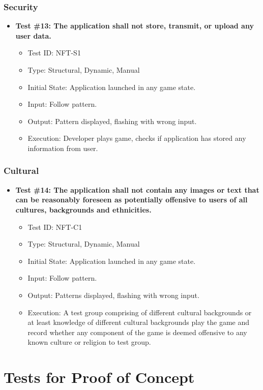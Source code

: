 \documentclass[12pt, titlepage]{article}
\begin{document}
\subsubsection{Security}
\begin{itemize}
\item \textbf{Test \#13: The application shall not store, transmit, or upload any user data.}
\begin{itemize}
\item Test ID: NFT-S1
\item Type: Structural, Dynamic, Manual				
\item Initial State: Application launched in any game state.		
\item Input: Follow pattern.
\item Output: Pattern displayed, flashing with wrong input.		
\item Execution: Developer plays game, checks if application has stored any information from user.
\end{itemize}
\end{itemize}


\subsubsection{Cultural}
\begin{itemize}
\item \textbf{Test \#14: The application shall not contain any images or text that can be reasonably foreseen as potentially offensive to users of all cultures, backgrounds and ethnicities.}
\begin{itemize}
\item Test ID: NFT-C1
\item Type: Structural, Dynamic, Manual				
\item Initial State: Application launched in any game state.		
\item Input: Follow pattern.
\item Output: Patterns displayed, flashing with wrong input.		
\item Execution: A test group comprising of different cultural backgrounds or at least knowledge of different cultural backgrounds play the game and record whether any component of the game is deemed offensive to any known culture or religion to test group.
\end{itemize}
\end{itemize}


\section{Tests for Proof of Concept}
\end{document}
